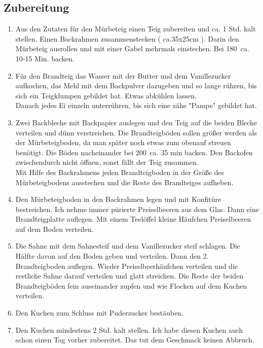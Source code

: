 \subsection*{Zubereitung}
\begin{enumerate}
	\item Aus den Zutaten für den Mürbeteig einen Teig zubereiten und ca. 1 Std. kalt stellen.
	Einen Backrahmen zusammenstecken ( ca.35x25cm ). Darin den Mürbeteig ausrollen und mit einer Gabel mehrmals einstechen. Bei 180\degree\  ca. 10-15 Min. backen.
	
	\item Für den Brandteig das Wasser mit der Butter und dem Vanillezucker aufkochen, das Mehl mit dem Backpulver dazugeben und so lange rühren, bis sich ein Teigklumpen gebildet hat. Etwas abkühlen lassen.\\
	Danach jedes Ei einzeln unterrühren, bis sich eine zähe "Pampe" gebildet hat.
	
	\item Zwei Backbleche mit Backpapier auslegen und den Teig auf die beiden Bleche verteilen und dünn verstreichen. Die Brandteigböden sollen größer werden als der Mürbeteigboden, da man später noch etwas zum obenauf streuen benötigt. Die Böden nacheinander bei 200\degree\  ca. 35 min backen. Den Backofen zwischendurch nicht öffnen, sonst fällt der Teig zusammen.\\
	Mit Hilfe des Backrahmens jeden Brandteigboden in der Größe des Mürbeteigbodens ausstechen und die Reste des Brandteiges aufheben.
	
	\item Den Mürbeteigboden in den Backrahmen legen und mit Konfitüre bestreichen. Ich nehme immer pürierte Preiselbeeren aus dem Glas. Dann eine Brandteigplatte auflegen. Mit einem Teelöffel kleine Häufchen Preiselbeeren auf dem Boden verteilen.
	
	\item Die Sahne mit dem Sahnesteif und dem Vanillezucker steif schlagen. Die Hälfte davon auf den Boden geben und verteilen. Dann den 2. Brandteigboden auflegen. Wieder Preiselbeerhäufchen verteilen und die restliche Sahne darauf verteilen und glatt streichen. Die Reste der beiden Brandteigböden fein auseinander zupfen und wie Flocken auf dem Kuchen verteilen.
	
	\item Den Kuchen zum Schluss mit Puderzucker bestäuben.
	\item Den Kuchen mindestens 2 Std. kalt stellen. Ich habe diesen Kuchen auch schon einen Tag vorher zubereitet. Das tut dem Geschmack keinen Abbruch. 
\end{enumerate}

